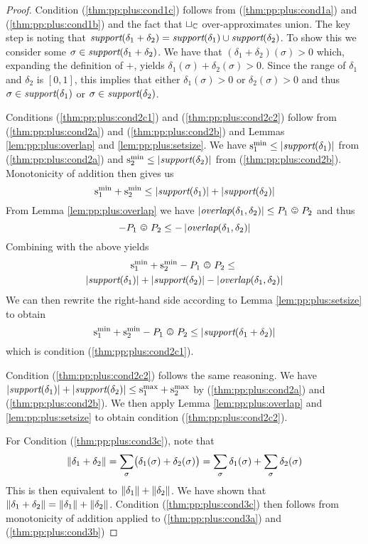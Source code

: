 \begin{proof}
Condition (\ref{thm:pp:plus:cond1c}) follows from
(\ref{thm:pp:plus:cond1a}) and (\ref{thm:pp:plus:cond1b}) and the fact
that $\sqcup_{\mathbb{C}}$ over-approximates union.  The key step is noting that
$\textit{support}(\delta_1 + \delta_2) = \textit{support}(\delta_1) \cup
\textit{support}(\delta_2)$.  To show this we consider some $\sigma \in
\textit{support}(\delta_1 + \delta_2)$.  We have that $(\delta_1 +
\delta_2)(\sigma) > 0$ which, expanding the definition of $+$, yields
$\delta_1(\sigma) + \delta_2(\sigma) > 0$.  Since the range of
$\delta_1$ and $\delta_2$ is $[0,1]$, this implies that either
$\delta_1(\sigma) > 0$ or $\delta_2(\sigma) > 0$ and thus $\sigma \in
\textit{support}(\delta_1)$ or $\sigma \in \textit{support}(\delta_2)$.

Conditions (\ref{thm:pp:plus:cond2c1}) and (\ref{thm:pp:plus:cond2c2})
follow from (\ref{thm:pp:plus:cond2a}) and (\ref{thm:pp:plus:cond2b})
and Lemmas \ref{lem:pp:plus:overlap} and \ref{lem:pp:plus:setsize}.
We have $\mathrm{s}^\mathrm{min}_{1} \leq \left| \textit{support}(\delta_1) \right|$ from (\ref{thm:pp:plus:cond2a})
and $\mathrm{s}^\mathrm{min}_{2} \leq \left| \textit{support}(\delta_2) \right|$ from (\ref{thm:pp:plus:cond2b}).
Monotonicity of addition then gives us
\[\mathrm{s}^\mathrm{min}_{1} + \mathrm{s}^\mathrm{min}_{2} \leq \left| \textit{support}(\delta_1) \right| + \left| \textit{support}(\delta_2) \right|\]
From Lemma \ref{lem:pp:plus:overlap} we have $\setsize{\overlap{\delta_1}{\delta_2}} \leq \optoverlap{\ppa}{\ppb}$ and thus
\[-\optoverlap{\ppa}{\ppb} \leq - \setsize{\overlap{\delta_1}{\delta_2}}\]
Combining with the above yields
\begin{multline*}
\smin{1} + \smin{2} - \optoverlap{\ppa}{\ppb} \leq {}\\
 \setsize{\nzset{\delta_1}} + \setsize{\nzset{\delta_2}} - \setsize{\overlap{\delta_1}{\delta_2}}
\end{multline*}
We can then rewrite the right-hand side according to Lemma \ref{lem:pp:plus:setsize} to obtain
\[\smin{1} + \smin{2} -\optoverlap{\ppa}{\ppb} \leq \setsize{\nzset{\delta_1 + \delta_2}}\]
which is condition (\ref{thm:pp:plus:cond2c1}).

Condition (\ref{thm:pp:plus:cond2c2}) follows the same reasoning.  We have $\left| \textit{support}(\delta_1) \right| + \left| \textit{support}(\delta_2) \right| \leq \mathrm{s}^\mathrm{max}_{1} + \mathrm{s}^\mathrm{max}_{2}$ by (\ref{thm:pp:plus:cond2a}) and (\ref{thm:pp:plus:cond2b}).  We then apply Lemma \ref{lem:pp:plus:overlap} and \ref{lem:pp:plus:setsize} to obtain condition (\ref{thm:pp:plus:cond2c2}).

For Condition (\ref{thm:pp:plus:cond3c}), note that
\[\mathord{\parallel}\delta_1 + \delta_2\mathord{\parallel} = \sum_\sigma\bigl(\delta_1(\sigma) + \delta_2(\sigma)\bigr) = \sum_\sigma \delta_1(\sigma) + \sum_\sigma \delta_2(\sigma)\]
This is then equivalent to $\mathord{\parallel}\delta_1\mathord{\parallel} + \mathord{\parallel}\delta_2\mathord{\parallel}$.
We have shown that $\mathord{\parallel}\delta_1 + \delta_2\mathord{\parallel} = \mathord{\parallel}\delta_1\mathord{\parallel} + \mathord{\parallel}\delta_2\mathord{\parallel}$.
Condition (\ref{thm:pp:plus:cond3c}) then follows from monotonicity of addition applied to (\ref{thm:pp:plus:cond3a}) and (\ref{thm:pp:plus:cond3b})


\end{proof}
